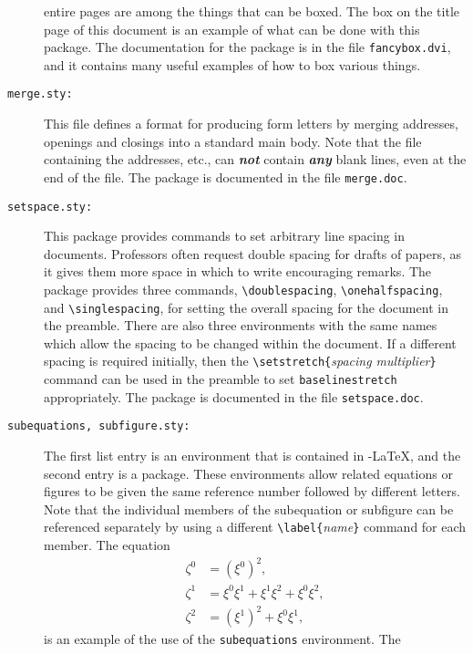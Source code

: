\documentclass[11pt,titlepage]{article}
\def\AmS{{$\mathcal{A}$\kern-.14em\lower.5ex\hbox{$\mathcal{M}$}%
\kern-.05em$\mathcal{S}$}}
\def\AmSLaTeX{\protect\AmS-\protect\LaTeX}
\begin{document}
\begin{description}
  entire pages are among the things that can be boxed.  The box on the title
  page of this document is an example of what can be done with this package.
  The documentation for the package is in the file
  \verb+fancybox.dvi+, and it contains many useful examples of how to
  box various things.
\item[\textmd{\texttt{merge.sty:}}] This file defines a format for producing
  form letters by merging addresses, openings and closings into a standard
  main body.  Note that the file containing the addresses, etc., can
  \textbf{\textit{not}} contain \textbf{\textit{any}} blank lines, even at the
  end of the file.  The package is documented in the file
  \verb+merge.doc+.
\item[\textmd{\texttt{setspace.sty:}}] This package provides commands to set
  arbitrary line spacing in documents.  Professors often request double
  spacing for drafts of papers, as it gives them more space in which to write
  encouraging remarks.  The package provides three commands,
  \verb+\doublespacing+, \verb+\onehalfspacing+, and \verb+\singlespacing+,
  for setting the overall spacing for the document in the preamble.  There are
  also three environments with the same names which allow the spacing to be
  changed within the document.  If a different spacing is required initially,
  then the \verb+\setstretch{+\textit{spacing multiplier}\verb+}+ command can
  be used in the preamble to set \texttt{baselinestretch} appropriately.  The
  package is documented in the file \verb+setspace.doc+.
\item[\textmd{\texttt{subequations, subfigure.sty:}}] The first list entry is
  an environment that is contained in \AmSLaTeX , and the second entry is a
  package.  These environments allow related equations or figures to be given
  the same reference number followed by different letters.  Note that the
  individual members of the subequation or subfigure can be referenced
  separately by using a different \verb+\label{+\textit{name}\verb+}+ command
  for each member.  The equation
  \begin{subequations}
    \begin{align}
      \zeta^0 & = (\xi^0)^2,\\
      \zeta^1 & = \xi^0\xi^1 + \xi^1\xi^2 + \xi^0\xi^2,\\
      \zeta^2 & = (\xi^1)^2 + \xi^0\xi^1,
    \end{align}
  \end{subequations}
  is an example of the use of the \texttt{subequations} environment.  The

\end{description}
\end{document}
